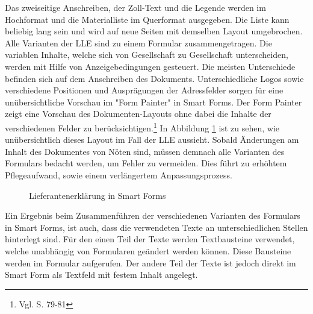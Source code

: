 	Das zweiseitige Anschreiben, der Zoll-Text und die Legende werden im Hochformat und die Materialliste im Querformat ausgegeben. Die Liste kann beliebig lang sein und wird auf neue Seiten mit demselben Layout umgebrochen. Alle Varianten der \ac{LLE} sind zu einem Formular zusammengetragen. Die variablen Inhalte, welche sich von Gesellschaft zu Gesellschaft unterscheiden, werden mit Hilfe von Anzeigebedingungen gesteuert. Die meisten Unterschiede befinden sich auf dem Anschreiben des Dokuments. Unterschiedliche Logos sowie verschiedene Positionen und Ausprägungen der Adressfelder sorgen für eine unübersichtliche Vorschau im "Form Painter" in Smart Forms. Der Form Painter zeigt eine Vorschau des Dokumenten-Layouts ohne dabei die Inhalte der verschiedenen Felder zu berücksichtigen.\footnote{Vgl. \cite{Hertleif.2003} S. 79-81}
	In Abbildung \ref{fig2} ist zu sehen, wie unübersichtlich dieses Layout im Fall der \ac{LLE} aussieht. Sobald Änderungen am Inhalt des Dokumentes von Nöten sind, müssen demnach alle Varianten des Formulars bedacht werden, um Fehler zu vermeiden. Dies führt zu erhöhtem Pflegeaufwand, sowie einem verlängertem Anpassungsprozess.
	
	\begin{figure}[ht]
		\centering
		\caption{Lieferantenerklärung in Smart Forms}
		\label{fig2}
	\end{figure}
	
	Ein Ergebnis beim Zusammenführen der verschiedenen Varianten des Formulars in Smart Forms, ist auch, dass die verwendeten Texte an unterschiedlichen Stellen hinterlegt sind. Für den einen Teil der Texte werden Textbausteine verwendet, welche unabhängig von Formularen geändert werden können. Diese Bausteine werden im Formular aufgerufen. Der andere Teil der Texte ist jedoch direkt im Smart Form als Textfeld mit festem Inhalt angelegt. 
	
